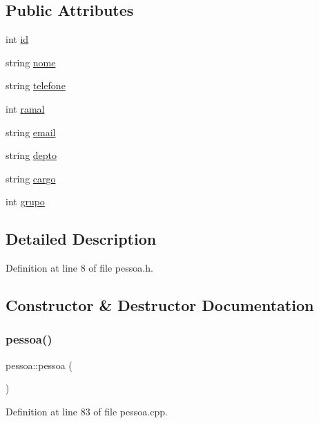 \subsection*{Public Attributes}
\begin{DoxyCompactItemize}
\item 
int \hyperlink{classpessoa_a8e80bd7d70d7d29b248ef5ec77720b5b}{id}
\item 
string \hyperlink{classpessoa_a7ff09497b62adeb87afd1531d72dee78}{nome}
\item 
string \hyperlink{classpessoa_aa73d0148299c1920e2ab238956a869ab}{telefone}
\item 
int \hyperlink{classpessoa_a3263ed9356bab20fb6c364483fe0d7b7}{ramal}
\item 
string \hyperlink{classpessoa_a8629e223b05473916ecda357a5fe1ad1}{email}
\item 
string \hyperlink{classpessoa_ac75b9d5e9934fdcb46c0d8b2c06a08b2}{depto}
\item 
string \hyperlink{classpessoa_a32474b998586278afec16302178c2856}{cargo}
\item 
int \hyperlink{classpessoa_a6930db502e29734eb026e291cf534ed9}{grupo}
\end{DoxyCompactItemize}


\subsection{Detailed Description}


Definition at line 8 of file pessoa.\+h.



\subsection{Constructor \& Destructor Documentation}
\hypertarget{classpessoa_ae2ee70812ff092a18c24ed94eaae260b}{}\label{classpessoa_ae2ee70812ff092a18c24ed94eaae260b} 
\subsubsection{\texorpdfstring{pessoa()}{pessoa()}}
{\footnotesize\ttfamily pessoa\+::pessoa (\begin{DoxyParamCaption}{ }\end{DoxyParamCaption})}



Definition at line 83 of file pessoa.\+cpp.



